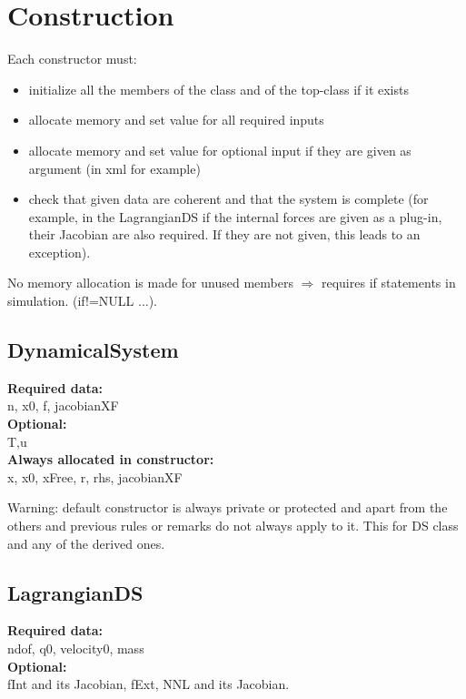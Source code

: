 \documentclass[10pt]{report}
\begin{document}
\section{Construction}

Each constructor must:
\begin{itemize}
\item initialize all the members of the class and of the top-class if it exists
\item allocate memory and set value for all required inputs
\item allocate memory and set value for optional input if they are given as argument (in xml for example)
\item check that given data are coherent and that the system is complete (for example, in the LagrangianDS
if the internal forces are given as a plug-in, their Jacobian are also required. If they are not given, this leads to an exception).
\end{itemize}

No memory allocation is made for unused members $\Rightarrow$ requires if statements in simulation.  (if!=NULL ...).\\

\subsection{DynamicalSystem}

{\bf Required data:}\\
n, x0, f, jacobianXF \\
{\bf Optional:}\\
T,u \\

\textbf{Always allocated in constructor:} \\
x, x0, xFree, r, rhs, jacobianXF

Warning: default constructor is always private or protected and apart from the others and previous rules or remarks do not always apply to it.
This for DS class and any of the derived ones.

\subsection{LagrangianDS}

\textbf{Required data:}\\
ndof, q0, velocity0, mass \\
\textbf{Optional:}\\
fInt and its Jacobian, fExt, NNL and its Jacobian. \\
\end{document}
